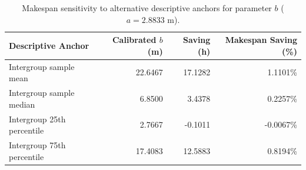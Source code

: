\begin{table}[!htbp]
\centering
\caption{Makespan sensitivity to alternative descriptive anchors for parameter $b$ ($a = 2.8833$ m).}
\label{tab:sensitivity_anchors}
\renewcommand{\arraystretch}{1.15}
\small
\begin{tabularx}{\textwidth}{Xrrr}
\toprule
\textbf{Descriptive Anchor} & \textbf{Calibrated $b$ (m)} & \textbf{Saving (h)} & \textbf{Makespan Saving (\%)} \\
\midrule
Intergroup sample mean & 22.6467 & 17.1282 & 1.1101\% \\
Intergroup sample median & 6.8500 & 3.4378 & 0.2257\% \\
Intergroup 25th percentile & 2.7667 & -0.1011 & -0.0067\% \\
Intergroup 75th percentile & 17.4083 & 12.5883 & 0.8194\% \\
\bottomrule
\end{tabularx}
\end{table}
